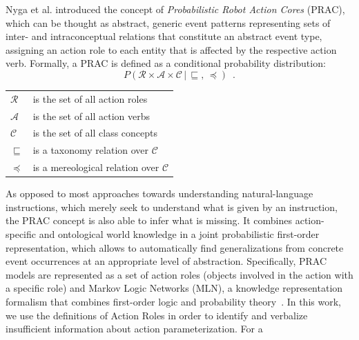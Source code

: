 \documentclass[oribibl]{llncs}
\begin{document}
Nyga et al.\cite{nyga12actioncore} introduced the concept of 
\emph{Probabilistic Robot Action Cores} (PRAC), which can be thought as abstract,
generic event patterns representing sets of 
inter- and intraconceptual relations that constitute an abstract 
event type, assigning an action role to each entity that is affected 
by the respective action verb. Formally, a PRAC is defined as a conditional
probability distribution:
\begin{equation}
P\left(\mathcal{R}\times\mathcal{A}\times\mathcal{C}\,|\,\sqsubseteq
,\, \preceq \right)\nonumber \enspace .
\end{equation}
{\small
\begin{center} \begin{tabular}{ll}
    $\mathcal{R}$  & is the set of all action roles\\
    $\mathcal{A}$  & is the set of all action verbs\\
    $\mathcal{C}$  & is the set of all class concepts\\
    $\sqsubseteq$ & is a taxonomy relation over $\mathcal{C}$\\
    $\preceq$	& is a mereological relation over $\mathcal{C}$
\end{tabular}
\end{center}}
As opposed to most approaches towards understanding natural-language 
instructions, which merely seek to understand what is given by an 
instruction, the PRAC concept is also able to infer what is missing. 
It combines action-specific and ontological world knowledge in a 
joint probabilistic first-order representation, which allows to 
automatically find generalizations from concrete event occurrences 
at an appropriate level of abstraction. Specifically, PRAC models 
are represented as a set of action roles (objects involved in the 
action with a specific role) and Markov Logic Networks (MLN), a 
knowledge representation formalism that combines first-order logic 
and probability theory~\cite{DBLP:journals/ml/RichardsonD06}. In this
work, we use the definitions of Action Roles in order to identify and
verbalize insufficient information about action parameterization. For a 
\end{document}
